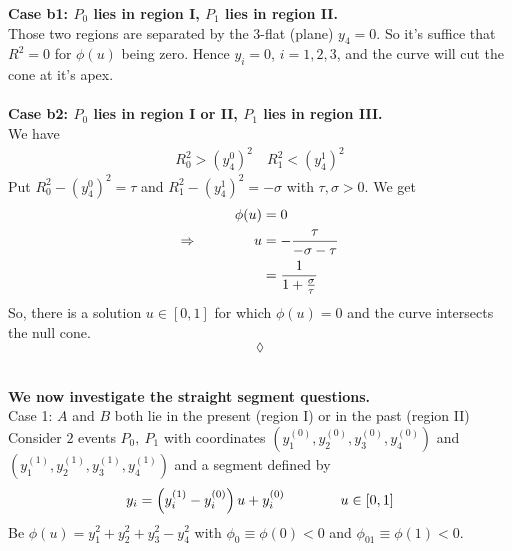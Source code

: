 \textbf{Case b1: $P_0$ lies in region I, $P_1$  lies in region II.} \\
Those two regions are separated by the $3$-flat (plane) $y_4=0$. So it's suffice that $R^2=0$ for $\phi(u)$ being zero. Hence $y_i=0$, $  i=1,2,3$, and the curve will cut the cone at it's apex.
\\\\
\textbf{Case b2: $P_0$ lies in region I or II, $P_1$  lies in region III.} \\
We have 
\begin{align*}
R_0^2 > (y_4^{0})^2\quad R_1^2 < (y_4^{1})^2
\end{align*}
Put $R_0^2 - (y_4^{0})^2= \tau$ and $R_1^2 - (y_4^{1})^2 =-\sigma$ with $\tau,\sigma >0$. We get
\begin{align*}
\phi(u)&=0\\
\Rightarrow \quad\quad\quad\quad u&=-\frac{\tau}{-\sigma-\tau}\\
&= \frac{1}{1+\frac{\sigma}{\tau}}
\end{align*}
So, there is a solution $u\in \left[0,1\right]$ for which $\phi(u)=0$ and the curve intersects the null cone.
\\$$\lozenge$$\\
\newpage

\textbf{We now investigate the straight segment questions.} \\
Case 1: $A$ and $B$ both lie in the present (region I) or in the past (region II)\\
Consider $2$ events $P_0,\ P_1$ with coordinates $(y_1^{(0)},y_2^{(0)},y_3^{(0)},y_4^{(0)})$ and $(y_1^{(1)},y_2^{(1)},y_3^{(1)},y_4^{(1)})$  and a segment  defined by 
\begin{align}y_i= \left(y_i^{(1)}-y_i^{(0)}\right)u + y_i^{(0)}\quad\quad\quad\quad u\in \left[0,1\right]
\end{align}
Be $\phi(u)= y_1^2+y_2^2+y_3^2-y_4^2$ with $\phi_0\equiv \phi(0) < 0$ and $\phi_01\equiv \phi(1) < 0$.\\














